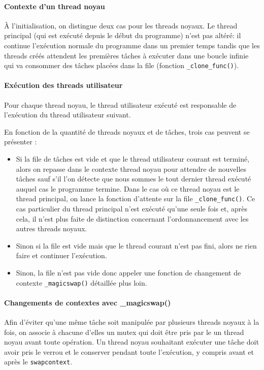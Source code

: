 \paragraph{Contexte d'un thread noyau} À l'initialisation, on distingue deux cas pour les threads noyaux. Le thread principal (qui est exécuté depuis le début du programme) n'est pas altéré: il continue l'exécution normale du programme dans un premier temps tandis que les threads créés attendent les premières tâches à exécuter dans une boucle infinie qui va consommer des tâches placées dans la file (fonction \verb!_clone_func()!).

\paragraph{Exécution des threads utilisateur} Pour chaque thread noyau, le thread utilisateur exécuté est responsable de l'exécution du thread utilisateur suivant. 

En fonction de la quantité de threads noyaux et de tâches, trois cas peuvent se présenter :
\begin{itemize}
	\item Si la file de tâches est vide et que le thread utilisateur courant est terminé, alors on repasse dans le contexte thread noyau pour attendre de nouvelles tâches sauf s'il l'on détecte que nous sommes le tout dernier thread exécuté auquel cas le programme termine. Dans le cas où ce thread noyau est le thread principal, on lance la fonction d'attente sur la file \verb!_clone_func()!. Ce cas particulier du thread principal n'est exécuté qu'une seule fois et, après cela, il n'est plus faite de distinction concernant l'ordonnancement avec les autres threads noyaux.
\item Sinon si la file est vide mais que le thread courant n'est pas fini, alors ne rien faire et continuer l'exécution.
\item Sinon, la file n'est pas vide donc appeler une fonction de changement de contexte \verb!_magicswap()! détaillée plus loin.
\end{itemize}

\paragraph{Changements de contextes avec \_magicswap()} Afin d'éviter qu'une même tâche soit manipulée par plusieurs threads noyaux à la fois, on associe à chacune d'elles un mutex qui doit être pris par le un thread noyau avant toute opération. Un thread noyau souhaitant exécuter une tâche doit avoir pris le verrou et le conserver pendant toute l'exécution, y compris avant et après le \verb!swapcontext!.

